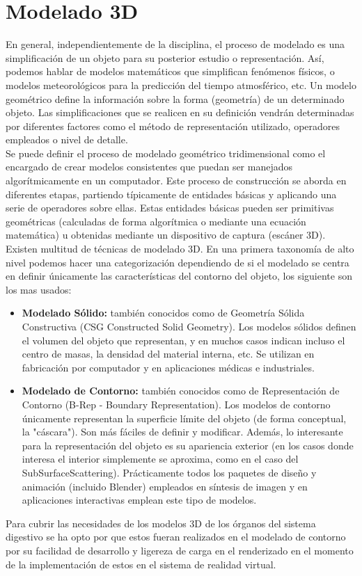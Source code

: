 \section{Modelado 3D}
En general, independientemente de la disciplina, el proceso de modelado es una simplificación de un objeto para su posterior estudio o representación. 
Así, podemos hablar de modelos matemáticos que simplifican fenómenos físicos, o modelos meteorológicos para la predicción del tiempo atmosférico, etc.
 Un modelo geométrico define la información sobre la forma (geometría) de un determinado objeto. Las simplificaciones que se realicen en su definición 
 vendrán determinadas por diferentes factores como el método de representación utilizado, operadores empleados o nivel de detalle.\cite{web13} \\
Se puede definir el proceso de modelado geométrico tridimensional como el encargado de crear modelos consistentes que puedan ser manejados algorítmicamente 
en un computador. Este proceso de construcción se aborda en diferentes etapas, partiendo típicamente de entidades básicas y aplicando una serie de operadores 
sobre ellas. Estas entidades básicas pueden ser primitivas geométricas (calculadas de forma algorítmica o mediante una ecuación matemática) u obtenidas mediante 
un dispositivo de captura (escáner 3D).\\
Existen multitud de técnicas de modelado 3D. En una primera taxonomía de alto nivel podemos hacer una categorización dependiendo de si el modelado se centra 
en definir únicamente las características del contorno del objeto, los siguiente son los mas usados:\\
\begin{itemize}
\item \textbf{Modelado Sólido:} también conocidos como de Geometría Sólida Constructiva (CSG Constructed Solid Geometry). Los modelos sólidos definen el volumen del objeto que representan, y en muchos casos indican incluso el centro de masas, la densidad del material interna, etc. Se utilizan en fabricación por computador y en aplicaciones médicas e industriales.
\item \textbf{Modelado de Contorno:} también conocidos como de Representación de Contorno (B-Rep - Boundary Representation). Los modelos de contorno únicamente representan la superficie límite del objeto (de forma conceptual, la "cáscara"). Son más fáciles de definir y modificar. Además, lo interesante para la representación del objeto es su apariencia exterior (en los casos donde interesa el interior simplemente se aproxima, como en el caso del SubSurfaceScattering). Prácticamente todos los paquetes de diseño y animación (incluido Blender) empleados en síntesis de imagen y en aplicaciones interactivas emplean este tipo de modelos.
\end{itemize}
Para  cubrir las necesidades de los modelos 3D de los órganos del sistema digestivo se ha opto por que estos fueran realizados en el modelado de contorno por su facilidad de desarrollo y ligereza de carga en el renderizado en el momento de la implementación de estos en el sistema de realidad virtual.\\

